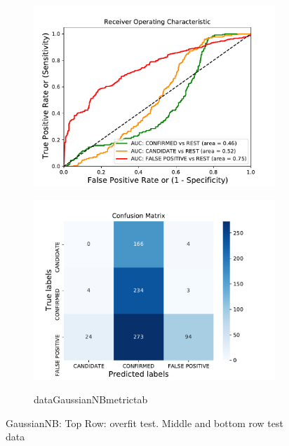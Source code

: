 \begin{figure}[H]
\begin{subfigure}{.49\textwidth}
                \includegraphics[width = 1\textwidth]{data/GaussianNB_roc.pdf}
                \end{subfigure}
                \begin{subfigure}{.49\textwidth}
                \includegraphics[width = 1\textwidth]{data/GaussianNB_cm.pdf}
                \end{subfigure}
                \begin{subfigure}{1\textwidth}
                \csname dataGaussianNBmetrictab\endcsname
                \end{subfigure}
                \caption{GaussianNB: Top Row: overfit test. Middle and bottom row test data}
                \label{fig:data/GaussianNB_roc}
                \end{figure}